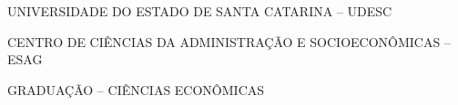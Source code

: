 

\renewcommand{\imprimircapa}{%
	\begin{capa}%
		\center

		{\fontseries{b}\selectfont\MakeTextUppercase{UNIVERSIDADE DO ESTADO DE SANTA CATARINA -- UDESC}}
		
		{\fontseries{b}\selectfont\MakeTextUppercase{CENTRO DE CIÊNCIAS DA ADMINISTRAÇÃO E SOCIOECONÔMICAS -- ESAG }}
		
		{\fontseries{b}\selectfont\MakeTextUppercase{GRADUAÇÃO -- CIÊNCIAS ECONÔMICAS}}
		
		\vfill
		
		{\fontseries{b}\selectfont\MakeTextUppercase{\normalsize\imprimirautor}}
		
		\vfill
		\begin{center}
			{\fontseries{b}\selectfont\MakeTextUppercase{\imprimirtitulo}}
		\end{center}
		\vfill
		
		\vfill
		
		{\fontseries{b}\selectfont\MakeTextUppercase{\imprimirlocal}}
		\par
		{\selectfont \imprimirdata}
		\vspace*{1cm}
	\end{capa}
}



\imprimircapa				%

